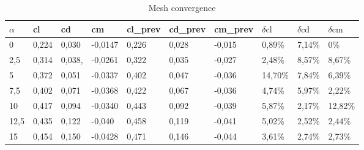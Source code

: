\begin{table}[H]
	\centering
	\caption{Mesh convergence}
	\label{tab:validation}
	\begin{tabular}{*{10}{l}} %
		\toprule
		$\alpha $& cl & cd & cm & cl\_prev & cd\_prev & cm\_prev & $\delta\text{cl}$ & $\delta\text{cd}$ & $\delta\text{cm}$ \\ \midrule 
		0 & 0,224 & 0,030 & -0,0147 & 0,226 & 0,028 & -0,015 & 0,89\% & 7,14\% & 0\% \\ \midrule
		2,5 & 0,314 & 0,038, & -0,0261 & 0,322 & 0,035 & -0,027 & 2,48\% & 8,57\% & 8,67\% \\ \midrule
		5 & 0,372 & 0,051 & -0,0337 & 0,402 & 0,047 & -0,036 & 14,70\% & 7,84\% & 6,39\% \\ \midrule
		7,5 & 0,402 & 0,071 & -0,0368 & 0,422 & 0,067 & -0,036 & 4,74\% & 5,97\% & 2,22\% \\ \midrule
		10 & 0,417 & 0,094 & -0,0340 & 0,443 & 0,092 & -0,039 & 5,87\% & 2,17\% & 12,82\% \\ \midrule
		12,5 & 0,435 & 0,122 & -0,040 & 0,458 & 0,119 & -0,041 & 5,02\% & 2,52\% & 2,44\% \\ \midrule
		15 & 0,454 & 0,150 & -0,0428 & 0,471 & 0,146 & -0,044 & 3,61\% & 2,74\% & 2,73\% \\ 
		
		\bottomrule
	\end{tabular}
\end{table}

